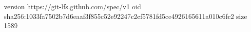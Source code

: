 version https://git-lfs.github.com/spec/v1
oid sha256:1033fa7502b7d6eaaf3f855c52e92247c2cf5781fd5ce4926165611a010c6fc2
size 1589
